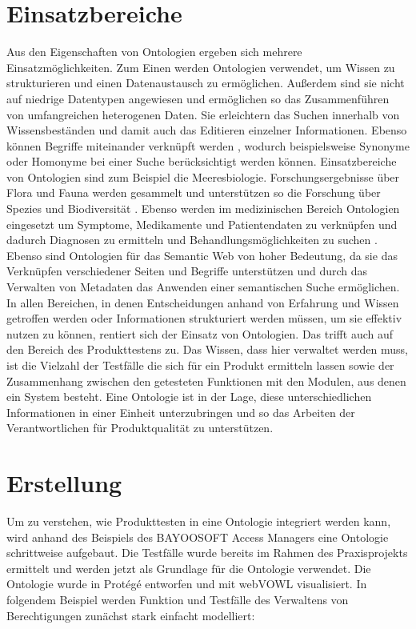\section{Einsatzbereiche}
Aus den Eigenschaften von Ontologien ergeben sich mehrere Einsatzmöglichkeiten. Zum Einen werden Ontologien verwendet, um Wissen zu strukturieren und einen Datenaustausch zu ermöglichen. Außerdem sind sie nicht auf niedrige Datentypen angewiesen und ermöglichen so das Zusammenführen von umfangreichen heterogenen Daten. Sie erleichtern das Suchen innerhalb von Wissensbeständen und damit auch das Editieren einzelner Informationen. Ebenso können Begriffe miteinander verknüpft werden \cite{BernersLee.2001}, wodurch beispielsweise Synonyme oder Homonyme bei einer Suche berücksichtigt werden können.\newline
Einsatzbereiche von Ontologien sind zum Beispiel die Meeresbiologie. Forschungsergebnisse über Flora und Fauna werden gesammelt und unterstützen so die Forschung über Spezies und Biodiversität \cite{Garoufallou.2013}.
Ebenso werden im medizinischen Bereich Ontologien eingesetzt um Symptome, Medikamente und Patientendaten zu verknüpfen und dadurch Diagnosen zu ermitteln und Behandlungsmöglichkeiten zu suchen \cite{WolfgangHesse.2005}.\newline
Ebenso sind Ontologien für das \glqq Semantic Web\grqq{} von hoher Bedeutung, da sie das Verknüpfen verschiedener Seiten und Begriffe unterstützen \cite{BernersLee.2001} und durch das Verwalten von Metadaten das Anwenden einer semantischen Suche ermöglichen. \newline
In allen Bereichen, in denen Entscheidungen anhand von Erfahrung und Wissen getroffen werden oder Informationen strukturiert werden müssen, um sie effektiv nutzen zu können, rentiert sich der Einsatz von Ontologien.\newline
Das trifft auch auf den Bereich des Produkttestens zu. Das Wissen, dass hier verwaltet werden muss, ist die Vielzahl der Testfälle die sich für ein Produkt ermitteln lassen sowie der Zusammenhang zwischen den getesteten Funktionen mit den Modulen, aus denen ein System besteht. Eine Ontologie ist in der Lage, diese unterschiedlichen Informationen in einer Einheit unterzubringen und so das Arbeiten der Verantwortlichen für Produktqualität zu unterstützen.
\section{Erstellung}
Um zu verstehen, wie Produkttesten in eine Ontologie integriert werden kann, wird anhand des Beispiels des BAYOOSOFT Access Managers eine Ontologie schrittweise aufgebaut. Die Testfälle wurde bereits im Rahmen des Praxisprojekts ermittelt und werden jetzt als Grundlage für die Ontologie verwendet. Die Ontologie wurde in Protégé entworfen und mit webVOWL visualisiert. \newline
In folgendem Beispiel werden Funktion und Testfälle des Verwaltens von Berechtigungen zunächst stark einfacht modelliert:\\

